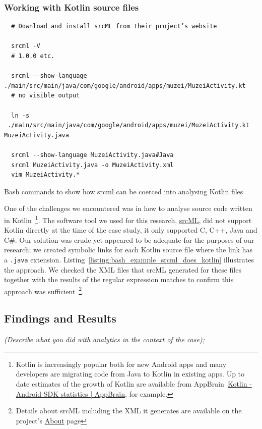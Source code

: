 \subsubsection{Working with Kotlin source files}
\label{subsection_srcml_working_with_kotlin_files}

\begin{listing}
\begin{verbatim}
  # Download and install srcML from their project’s website

  srcml -V
  # 1.0.0 etc.

  srcml --show-language ./main/src/main/java/com/google/android/apps/muzei/MuzeiActivity.kt
  # no visible output

  ln -s  ./main/src/main/java/com/google/android/apps/muzei/MuzeiActivity.kt MuzeiActivity.java

  srcml --show-language MuzeiActivity.java#Java
  srcml MuzeiActivity.java -o MuzeiActivity.xml
  vim MuzeiActivity.*
\end{verbatim}
\caption{Bash commands to show how srcml can be coerced into analysing Kotlin files}
\label{listing:bash_example_srcml_does_kotlin}
\end{listing}

One of the challenges we encountered was in how to analyse source code written in Kotlin~\footnote{Kotlin is increasingly popular both for new Android apps and many developers are migrating code from Java to Kotlin in existing apps. 
%
Up to date estimates of the growth of Kotlin are available from AppBrain~\href{https://www.appbrain.com/stats/libraries/details/kotlin/kotlin}{Kotlin - Android SDK statistics | AppBrain}, for example.}. 
The software tool we used for this research, \href{https://www.srcml.org/}{srcML}, did not support Kotlin directly at the time of the case study, it only supported C, C++, Java and C\#. Our solution was crude yet appeared to be adequate for the purposes of our research; we created symbolic links for each Kotlin source file where the link has a \texttt{.java} extension. Listing~\ref{listing:bash_example_srcml_does_kotlin} illustrates the approach. We checked the XML files that srcML generated for these files together with the results of the regular expression matches to confirm this approach was sufficient~\footnote{Details about srcML including the XML it generates are available on the project's \href{https://www.srcml.org/about.html}{About} page}.

\subsection{Findings and Results}
\textit{(Describe what you did with analytics in the context of the case);} 



